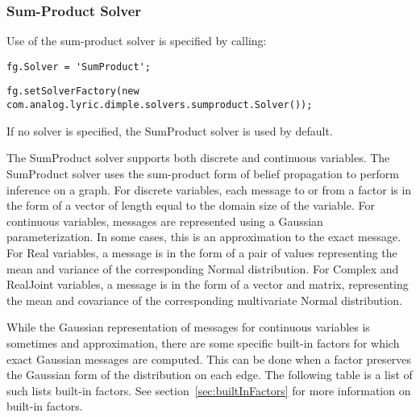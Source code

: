 \subsubsection{Sum-Product Solver}
\label{sec:SumProductSolver}

Use of the sum-product solver is specified by calling:

\ifmatlab
\begin{lstlisting}
fg.Solver = 'SumProduct';
\end{lstlisting}
\fi

\ifjava
\begin{lstlisting}
fg.setSolverFactory(new com.analog.lyric.dimple.solvers.sumproduct.Solver());
\end{lstlisting}
\fi

If no solver is specified, the SumProduct solver is used by default.

The SumProduct solver supports both discrete and continuous variables.  The SumProduct solver uses the sum-product form of belief propagation to perform inference on a graph.  For discrete variables, each message to or from a factor is in the form of a vector of length equal to the domain size of the variable.  For continuous variables, messages are represented using a Gaussian parameterization.  In some cases, this is an approximation to the exact message.  For Real variables, a message is in the form of a pair of values representing the mean and variance of the corresponding Normal distribution.  For Complex and RealJoint variables, a message is in the form of a vector and matrix, representing the mean and covariance of the corresponding multivariate Normal distribution.

While the Gaussian representation of messages for continuous variables is sometimes and approximation, there are some specific built-in factors for which exact Gaussian messages are computed.  This can be done when a factor preserves the Gaussian form of the distribution on each edge.  The following table is a list of such lists built-in factors.  See section~\ref{sec:builtInFactors} for more information on built-in factors.

